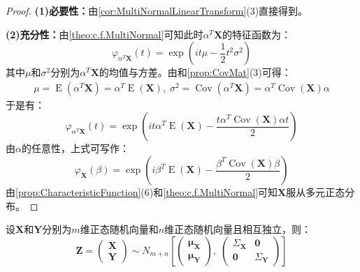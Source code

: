 \begin{proof}
	\textbf{(1)必要性：}由\cref{cor:MultiNormalLinearTransform}(3)直接得到。\par
	\textbf{(2)充分性：}由\cref{theo:c.f.MultiNormal}可知此时$\alpha^T\mathbf{X}$的特征函数为：
	\begin{equation*}
		\varphi_{\alpha^T\mathbf{X}}(t)=\exp\left(it\mu-\frac{1}{2}t^2\sigma^2\right)
	\end{equation*}
	其中$\mu$和$\sigma^2$分别为$\alpha^T\mathbf{X}$的均值与方差。由和\cref{prop:CovMat}(3)可得：
	\begin{gather*}
		\mu=\operatorname{E}(\alpha^T\mathbf{X})=\alpha^T\operatorname{E}(\mathbf{X}),\;
		\sigma^2=\operatorname{Cov}(\alpha^T\mathbf{X})=\alpha^T\operatorname{Cov}(\mathbf{X})\alpha
	\end{gather*}
	于是有：
	\begin{equation*}
		\varphi_{\alpha^T\mathbf{X}}(t)=\exp\left(it\alpha^T\operatorname{E}(\mathbf{X})-\frac{t\alpha^T\operatorname{Cov}(\mathbf{X})\alpha t}{2}\right)
	\end{equation*}
	由$\alpha$的任意性，上式可写作：
	\begin{equation*}
		\varphi_{\mathbf{X}}(\beta)=\exp\left(i\beta^T\operatorname{E}(\mathbf{X})-\frac{\beta^T\operatorname{Cov}(\mathbf{X})\beta}{2}\right)
	\end{equation*}
	由\cref{prop:CharacteristicFunction}(6)和\cref{theo:c.f.MultiNormal}可知$\mathbf{X}$服从多元正态分布。
\end{proof}
\begin{theorem}\label{theo:MultiNormalConcat}
	设$\mathbf{X}$和$\mathbf{Y}$分别为$m$维正态随机向量和$n$维正态随机向量且相互独立，则：
	\begin{equation*}
		\mathbf{Z}=
		\begin{pmatrix}
			\mathbf{X} \\
			\mathbf{Y}
		\end{pmatrix}
		\sim N_{m+n}\left[
		\begin{pmatrix}
			\boldsymbol{\mu}_{\mathbf{X}} \\
			\boldsymbol{\mu}_{\mathbf{Y}}
		\end{pmatrix},\;
		\begin{pmatrix}
			\Sigma_\mathbf{X} & \mathbf{0} \\
			\mathbf{0} & \Sigma_\mathbf{Y}
		\end{pmatrix}
		\right]
	\end{equation*}
\end{theorem}
